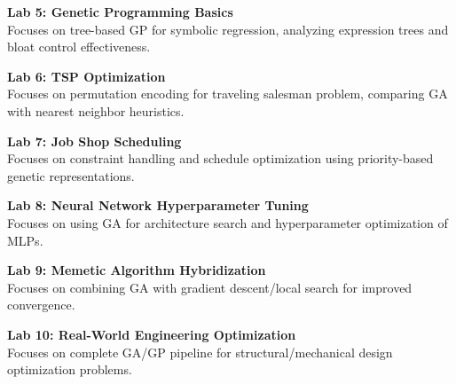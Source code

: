 \vspace{0.2cm}

\noindent\textbf{Lab 5: Genetic Programming Basics} \\
Focuses on tree-based GP for symbolic regression, analyzing expression trees and bloat control effectiveness.

\vspace{0.2cm}

\noindent\textbf{Lab 6: TSP Optimization} \\
Focuses on permutation encoding for traveling salesman problem, comparing GA with nearest neighbor heuristics.

\vspace{0.2cm}

\noindent\textbf{Lab 7: Job Shop Scheduling} \\
Focuses on constraint handling and schedule optimization using priority-based genetic representations.

\vspace{0.2cm}

\noindent\textbf{Lab 8: Neural Network Hyperparameter Tuning} \\
Focuses on using GA for architecture search and hyperparameter optimization of MLPs.

\vspace{0.2cm}

\noindent\textbf{Lab 9: Memetic Algorithm Hybridization} \\
Focuses on combining GA with gradient descent/local search for improved convergence.

\vspace{0.2cm}

\noindent\textbf{Lab 10: Real-World Engineering Optimization} \\
Focuses on complete GA/GP pipeline for structural/mechanical design optimization problems.

\vspace{0.2cm}

\newpage
{}
